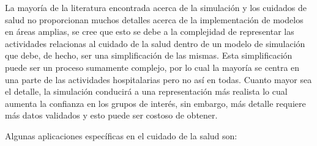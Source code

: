 La mayoría de la literatura encontrada acerca de la simulación y los cuidados de
salud no proporcionan muchos detalles acerca de la implementación de modelos en
áreas amplias, se cree que esto se debe a la complejidad de representar las
actividades relacionas al cuidado de la salud dentro de un modelo de simulación
que debe, de hecho, ser una simplificación de las mismas. Esta simplificación
puede ser un proceso sumamente complejo, por lo cual la mayoría se centra en una
parte de las actividades hospitalarias pero no así en todas. Cuanto mayor sea el
detalle, la simulación conducirá a una representación más realista lo cual
aumenta la confianza en los grupos de interés, sin embargo, más detalle requiere
más datos validados y esto puede ser costoso de obtener\cite{guna:simulation}.

Algunas aplicaciones específicas en el cuidado de la salud son:

